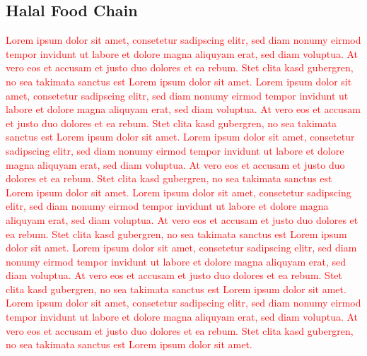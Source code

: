 \subsection{Halal Food Chain}
\citep{Tan2018}
\citep{Zailani2010}
\citep{Rejeb2018}
\textcolor{red}{Lorem ipsum dolor sit amet, consetetur sadipscing elitr, sed diam nonumy eirmod tempor invidunt ut labore et dolore magna aliquyam erat, sed diam voluptua. At vero eos et accusam et justo duo dolores et ea rebum. Stet clita kasd gubergren, no sea takimata sanctus est Lorem ipsum dolor sit amet. Lorem ipsum dolor sit amet, consetetur sadipscing elitr, sed diam nonumy eirmod tempor invidunt ut labore et dolore magna aliquyam erat, sed diam voluptua. At vero eos et accusam et justo duo dolores et ea rebum. Stet clita kasd gubergren, no sea takimata sanctus est Lorem ipsum dolor sit amet. Lorem ipsum dolor sit amet, consetetur sadipscing elitr, sed diam nonumy eirmod tempor invidunt ut labore et dolore magna aliquyam erat, sed diam voluptua. At vero eos et accusam et justo duo dolores et ea rebum. Stet clita kasd gubergren, no sea takimata sanctus est Lorem ipsum dolor sit amet. Lorem ipsum dolor sit amet, consetetur sadipscing elitr, sed diam nonumy eirmod tempor invidunt ut labore et dolore magna aliquyam erat, sed diam voluptua. At vero eos et accusam et justo duo dolores et ea rebum. Stet clita kasd gubergren, no sea takimata sanctus est Lorem ipsum dolor sit amet. Lorem ipsum dolor sit amet, consetetur sadipscing elitr, sed diam nonumy eirmod tempor invidunt ut labore et dolore magna aliquyam erat, sed diam voluptua. At vero eos et accusam et justo duo dolores et ea rebum. Stet clita kasd gubergren, no sea takimata sanctus est Lorem ipsum dolor sit amet. Lorem ipsum dolor sit amet, consetetur sadipscing elitr, sed diam nonumy eirmod tempor invidunt ut labore et dolore magna aliquyam erat, sed diam voluptua. At vero eos et accusam et justo duo dolores et ea rebum. Stet clita kasd gubergren, no sea takimata sanctus est Lorem ipsum dolor sit amet.}

\newpage
